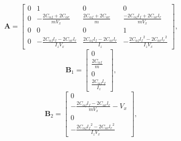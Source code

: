 \documentclass[12pt,a4paper]{cibb}
\begin{document}
\begin{equation} \label{eq:MatA}
   \textbf{A} =       \begin{bmatrix}
                      0 & 1 & 0 & 0 \\
                      
                      0 & 
                      -\frac{2C_{\alpha f}+2C_{\alpha r}}{mV_x}  & 
                      \frac{2C_{\alpha f}+2C_{\alpha r}}{m}        & 
                      \frac{-2C_{\alpha f}l_f+2C_{\alpha r}l_r}{mV_x} \\
                      
                      0 & 0  & 0 & 1 \\
                      
                      
                      0 & 
                      -\frac{2C_{\alpha f}l_f - 2C_{\alpha r}l_r}{I_zV_x} & 
                      \frac{2C_{\alpha f}l_f  - 2C_{\alpha r}l_r}{I_z} & 
                      -\frac{2C_{\alpha f}{l_f}^2 - 2C_{\alpha r}{l_r}^2}{I_zV_x}
                  \end{bmatrix},
\end{equation}
\begin{equation} \label{eq:MatB1}
      \textbf{B}_1 =       \begin{bmatrix}
                          0 \\
                          \frac{2C_{\alpha f}}{m} \\
                          0 \\
                          \frac{2C_{\alpha f}l_f}{I_z} 
                         \end{bmatrix},
\end{equation}
\begin{equation} \label{eq:MatB2}
      \textbf{B}_2 =       \begin{bmatrix}
                          0 \\
                          -\frac{2C_{\alpha f}l_f -2C_{\alpha r}l_r}{mV_x}-V_x \\
                          0 \\
                          -\frac{2C_{\alpha f}{l_f}^2 - 2C_{\alpha r}{l_r}^2}{I_zV_x}
                          \end{bmatrix},
\end{equation}
\end{document}
